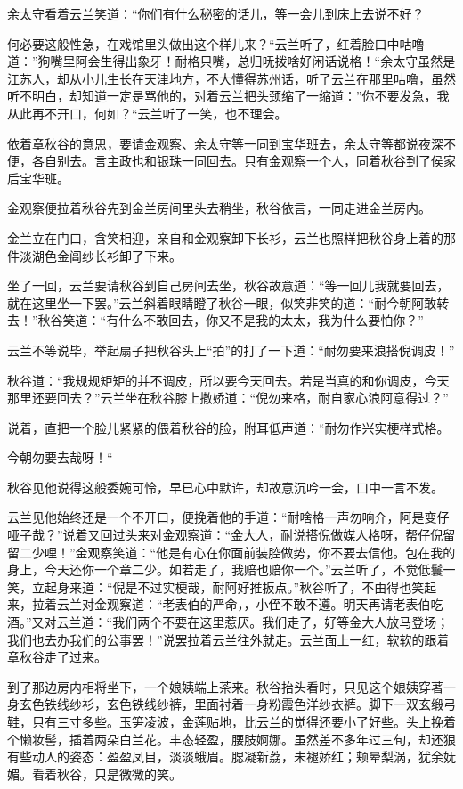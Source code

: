 \documentclass[12pt,UTF8]{ctexbook}
\begin{document}
{{{余太守看着云兰笑道：“你们有什么秘密的话儿，等一会儿到床上去说不好？

何必要这般性急，在戏馆里头做出这个样儿来？“云兰听了，红着脸口中咕噜道：”狗嘴里阿会生得出象牙！耐格只嘴，总归呒拨啥好闲话说格！“余太守虽然是江苏人，却从小儿生长在天津地方，不大懂得苏州话，听了云兰在那里咕噜，虽然听不明白，却知道一定是骂他的，对着云兰把头颈缩了一缩道：”你不要发急，我从此再不开口，何如？“云兰听了一笑，也不理会。

依着章秋谷的意思，要请金观察、余太守等一同到宝华班去，余太守等都说夜深不便，各自别去。言主政也和银珠一同回去。只有金观察一个人，同着秋谷到了侯家后宝华班。

金观察便拉着秋谷先到金兰房间里头去稍坐，秋谷依言，一同走进金兰房内。

金兰立在门口，含笑相迎，亲自和金观察卸下长衫，云兰也照样把秋谷身上着的那件淡湖色金阊纱长衫卸了下来。

坐了一回，云兰要请秋谷到自己房间去坐，秋谷故意道：“等一回儿我就要回去，就在这里坐一下罢。”云兰斜着眼睛瞪了秋谷一眼，似笑非笑的道：“耐今朝阿敢转去！”秋谷笑道：“有什么不敢回去，你又不是我的太太，我为什么要怕你？”

云兰不等说毕，举起扇子把秋谷头上“拍”的打了一下道：“耐勿要来浪搭倪调皮！”

秋谷道：“我规规矩矩的并不调皮，所以要今天回去。若是当真的和你调皮，今天那里还要回去？”云兰坐在秋谷膝上撒娇道：“倪勿来格，耐自家心浪阿意得过？”

说着，直把一个脸儿紧紧的偎着秋谷的脸，附耳低声道：“耐勿作兴实梗样式格。

今朝勿要去哉呀！“

秋谷见他说得这般委婉可怜，早已心中默许，却故意沉吟一会，口中一言不发。

云兰见他始终还是一个不开口，便挽着他的手道：“耐啥格一声勿响介，阿是变仔哑子哉？”说着又回过头来对金观察道：“金大人，耐说搭倪做媒人格呀，帮仔倪留留二少哩！”金观察笑道：“他是有心在你面前装腔做势，你不要去信他。包在我的身上，今天还你一个章二少。如若走了，我赔也赔你一个。”云兰听了，不觉低鬟一笑，立起身来道：“倪是不过实梗哉，耐阿好推扳点。”秋谷听了，不由得也笑起来，拉着云兰对金观察道：“老表伯的严命，，小侄不敢不遵。明天再请老表伯吃酒。”又对云兰道：“我们两个不要在这里惹厌。我们走了，好等金大人放马登场；我们也去办我们的公事罢！”说罢拉着云兰往外就走。云兰面上一红，软软的跟着章秋谷走了过来。

到了那边房内相将坐下，一个娘姨端上茶来。秋谷抬头看时，只见这个娘姨穿著一身玄色铁线纱衫，玄色铁线纱裤，里面衬着一身粉霞色洋纱衣裤。脚下一双玄缎弓鞋，只有三寸多些。玉笋凌波，金莲贴地，比云兰的觉得还要小了好些。头上挽着个懒妆髻，插着两朵白兰花。丰态轻盈，腰肢婀娜。虽然差不多年过三旬，却还狠有些动人的姿态：盈盈凤目，淡淡蛾眉。腮凝新荔，未褪娇红；颊晕梨涡，犹余妩媚。看着秋谷，只是微微的笑。

}}}
\end{document}
